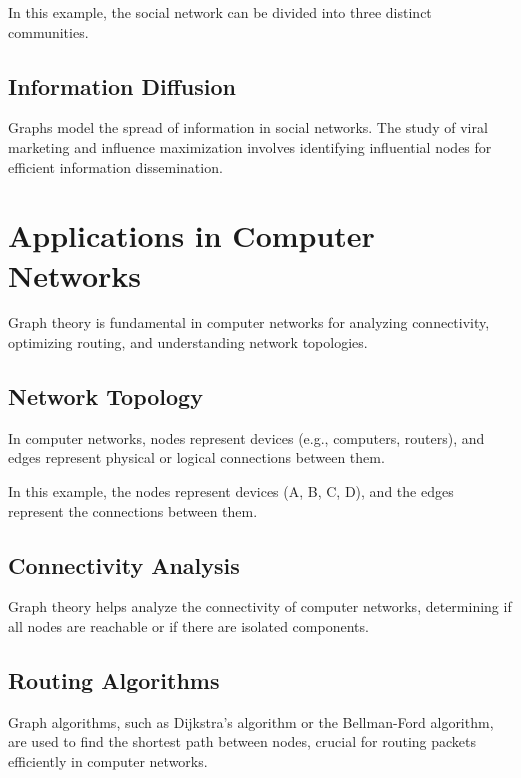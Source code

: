 \documentclass{article}
\begin{document}
In this example, the social network can be divided into three distinct communities.

\subsection{Information Diffusion}
Graphs model the spread of information in social networks. The study of viral marketing and influence maximization involves identifying influential nodes for efficient information dissemination.

\section{Applications in Computer Networks}
Graph theory is fundamental in computer networks for analyzing connectivity, optimizing routing, and understanding network topologies.

\subsection{Network Topology}
In computer networks, nodes represent devices (e.g., computers, routers), and edges represent physical or logical connections between them.

\begin{center}
\end{center}

In this example, the nodes represent devices (A, B, C, D), and the edges represent the connections between them.

\subsection{Connectivity Analysis}
Graph theory helps analyze the connectivity of computer networks, determining if all nodes are reachable or if there are isolated components.

\subsection{Routing Algorithms}
Graph algorithms, such as Dijkstra's algorithm or the Bellman-Ford algorithm, are used to find the shortest path between nodes, crucial for routing packets efficiently in computer networks.
\end{document}
